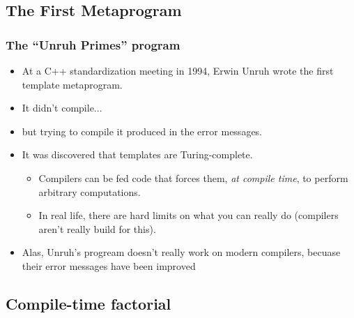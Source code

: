 \subsection{The First Metaprogram}
\begin{frame}[fragile,t]
\frametitle{The ``Unruh Primes'' program}
\begin{itemize}[<+->]
\item At a C++ standardization meeting in 1994, Erwin Unruh wrote the
  first template metaprogram.
\item It didn't compile...
\item but trying to compile it produced 
  in the error messages.
\item It was discovered that templates are Turing-complete.
  \begin{itemize}
  \item Compilers can be fed code that forces them, \emph{at compile
    time}, to perform arbitrary computations.
  \item In real life, there are hard limits on what you can really
    do (compilers aren't really build for this).
    \end{itemize}
\item Alas, Unruh's progream doesn't really work on modern compilers, becuase their error messages
  have been improved
\end{itemize}

\end{frame}


\subsection{Compile-time factorial}

